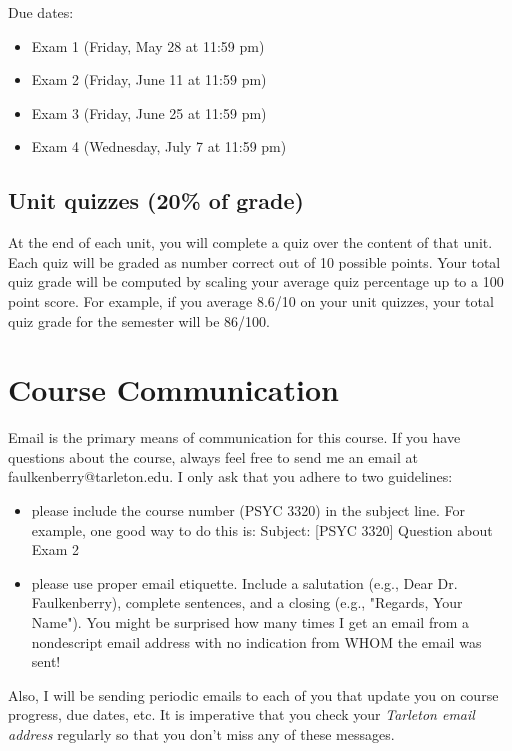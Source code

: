 \documentclass[10pt]{article}
\begin{document}
Due dates:

\begin{itemize}
\item Exam 1 (Friday, May 28 at 11:59 pm)
\item Exam 2 (Friday, June 11 at 11:59 pm)
\item Exam 3 (Friday, June 25 at 11:59 pm)
\item Exam 4 (Wednesday, July 7 at 11:59 pm)
\end{itemize}

\subsection*{Unit quizzes (20\% of grade)}
\label{sec:orge2cf67e}
At the end of each unit, you will complete a quiz over the content of that  unit. Each quiz will be graded as number correct out of 10 possible points.  Your total quiz grade will be computed by scaling your average quiz percentage up to a 100 point score.  For example, if you average 8.6/10 on your unit quizzes, your total quiz grade for the semester will be 86/100. 

\section*{Course Communication}
\label{sec:orgbb70165}

Email is the primary means of communication for this course.  If you have questions about the course, always feel free to send me an email at faulkenberry@tarleton.edu.  I only ask that you adhere to two guidelines:
\begin{itemize}
\item please include the course number (PSYC 3320) in the subject line.  For example, one good way to do this is:  Subject: [PSYC 3320] Question about Exam 2
\item please use proper email etiquette.  Include a salutation (e.g., Dear Dr. Faulkenberry), complete sentences, and a closing (e.g., "Regards, Your Name").  You might be surprised how many times I get an email from a nondescript email address with no indication from WHOM the email was sent!
\end{itemize}

Also, I will be sending periodic emails to each of you that update you on course progress, due dates, etc. It is imperative that you check your \emph{Tarleton email address} regularly so that you don't miss any of these messages.
\end{document}
